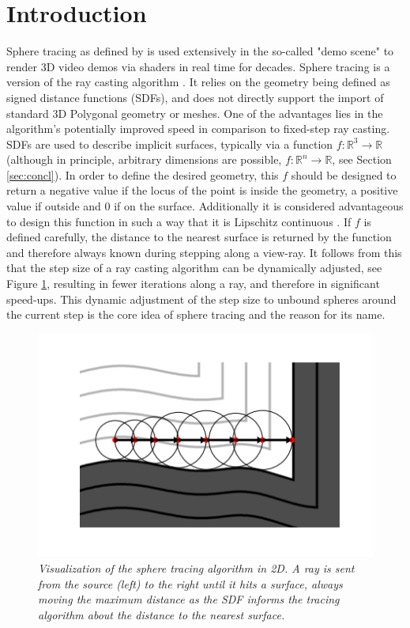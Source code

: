 \documentclass[twoside,a4paper]{article}
\begin{document}
\section{Introduction}
\label{sec:intro}
Sphere tracing as defined by \cite{hart_sphere_1996} is used extensively in the so-called "demo scene" to render 3D video demos via shaders in real time for decades. 
Sphere tracing is a version of the ray casting algorithm \cite{roth_ray_1982}. It relies on the geometry being defined as signed distance functions (SDFs), and does not directly support the import of standard 3D Polygonal geometry or meshes. One of the advantages lies in the algorithm's potentially improved speed in comparison to fixed-step ray casting. SDFs are used to describe implicit surfaces, typically via a function $f : \mathbb{R}^3 \rightarrow \mathbb{R}$(although in principle, arbitrary dimensions are possible, $f : \mathbb{R}^n \rightarrow \mathbb{R}$, see Section \ref{sec:concl}). In order to define the desired geometry, this $f$ should be designed to return a negative value if the locus of the point is inside the geometry, a positive value if outside and 0 if on the surface. Additionally it is considered advantageous to design this function in such a way that it is Lipschitz continuous \cite{hart_sphere_1996}. If $f$ is defined carefully, the distance to the nearest surface is returned by the function and therefore always known during stepping along a view-ray. 
It follows from this that the step size of a ray casting algorithm can be dynamically adjusted, see Figure \ref{sphereViz}, resulting in fewer iterations along a ray, and therefore in significant speed-ups. This dynamic adjustment of the step size to unbound spheres around the current step is the core idea of sphere tracing and the reason for its name\cite{hart_sphere_1996}.

\begin{figure}[ht]
\centerline{\includegraphics[scale=0.5]{img/sphereTracingViz.png}}
\caption{\label{sphereViz}{\it Visualization of the sphere tracing algorithm in 2D. A ray is sent from the source (left) to the right until it hits a surface, always moving the maximum distance as the SDF informs the tracing algorithm about the distance to the nearest surface.}}
\end{figure}
\end{document}
